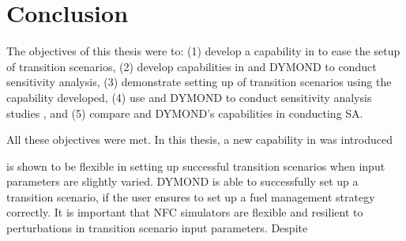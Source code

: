 \chapter{Conclusion}


The objectives of this thesis were to: 
(1) develop a capability in \Cyclus to ease the setup of 
transition scenarios, 
(2) develop capabilities in \Cyclus and DYMOND to conduct 
sensitivity analysis,
(3) demonstrate setting up of \Cyclus transition scenarios using the 
capability developed,
(4) use \Cyclus and DYMOND to conduct sensitivity analysis studies
, and
(5) compare \Cyclus and DYMOND's capabilities in conducting \gls{SA}. 

All these objectives were met. 
In this thesis, a new capability in \Cyclus was introduced 

\Cyclus is shown to be flexible in setting up successful transition 
scenarios when input parameters are slightly varied.
DYMOND is able to successfully set up a transition scenario, if the 
user ensures to set up a fuel management strategy correctly. 
It is important that \gls{NFC} simulators are flexible and resilient to 
perturbations in transition scenario input parameters. 
Despite 


